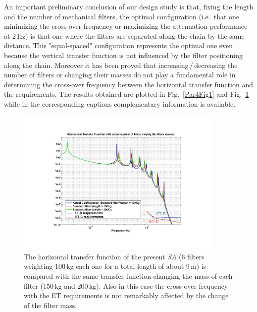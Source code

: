 %
An important preliminary conclusion of our design study is that, fixing the length and the number of mechanical filters, the optimal configuration (i.e.\ that one minimizing the cross-over frequency or maximizing the attenuation performance at 2\,Hz) is that one where the filters are separated along the chain by the same distance. This "equal-spaced" configuration represents the optimal one even because the vertical transfer function is not influenced by the filter positioning along the chain. Moreover it has been proved that increasing\,/\,decreasing the number of filters or changing their masses do not play a fundamental role in determining the cross-over frequency between the horizontal transfer function and the requirements. The results obtained are plotted in Fig.~\ref{Par4Fig1} and Fig.~\ref{Par4Fig2} while in the corresponding captions complementary information is available.  
%
\begin{figure}[t]
	\begin{center}
		\includegraphics[width=0.9\textwidth]{./Sec_Suspensions/Figures/Par4-Fig2.pdf}
			\caption{The horizontal transfer function of the present \emph{SA} (6 filters weighting 100\,kg each one for a total length of about 9\,m) is compared with the same transfer function changing the mass of each filter (150\,kg and 200\,kg). Also in this case the cross-over frequency with the ET requirements is not remarkably affected by the change of the filter mass.}
\label{Par4Fig2}
	\end{center}
\end{figure}
%
